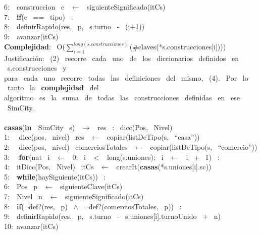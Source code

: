 \begin{Algoritmos}
    6:\indent \indent  \  \ construccion \ c \ $\leftarrow$ \ siguienteSignificado(itCs)\\
    7:\indent \indent  \  \ \textbf{if}(c \ == \ tipo) \ :\\
    8:\indent \indent \indent  \  \ definirRapido(res, \ p, \ s.turno \ - \ (i+1))\\
    9:\indent \indent  \  \ avanzar(itCs) \ \\
    \textbf{Complejidad}: \ O($\sum_{i=1}^{long(s.construcciones)}$($ \# $claves(*s.construcciones[i])))\\
    Justificaci\'on: \ (2) \ recorre \ cada \ uno \ de \ los \ diccionarios \ definidos \ en \ s.construcciones \ y\\
    para \ cada \ uno \ recorre \ todas \ las \ definiciones \ del \ mismo, \ (4). \ Por \ lo \ tanto \ la \ \textbf{complejidad} \ del\\
    algoritmo \ es \ la \ suma \ de \ todas \ las \ construcciones \ definidas \ en \ ese \ SimCity.\\
    \makebox[\linewidth]{\rule{\textwidth}{0.4pt}}
    \\
    \makebox[\linewidth]{\rule{\textwidth}{0.4pt}}
    \textbf{casas}(\textbf{in \ }SimCity \ s) \ $\rightarrow $ \ res \ : \ dicc(Pos, \ Nivel)\\
    1: \  \ dicc(pos, \ nivel) \ res \ $\leftarrow$ \ copiar(listDeTipo(s, \ ``casa''))\\
    2: \  \ dicc(pos, \ nivel) \ comerciosTotales \ $\leftarrow$ \ copiar(listDeTipo(s, \ ``comercio''))\\
    3: \  \ \textbf{for}(nat \ i \ $\leftarrow$ \ 0; \ i \ $<$ \ long(s.uniones); \ i \ $\leftarrow$ \ i \ + \ 1) \ : \ \\
    4:\indent  \  \ itDicc(Pos, \ Nivel) \ itCs \ $\leftarrow$ \ crearIt(\textbf{casas}(*s.uniones[i].sc))\\
    5:\indent  \  \ \textbf{while}(haySiguiente(itCs)) \ :\\
    6:\indent \indent  \  \ Pos \ p \ $\leftarrow$ \ siguienteClave(itCs)\\
    7:\indent \indent  \  \ Nivel \ n \ $\leftarrow$ \ siguienteSignificado(itCs)\\
    8:\indent \indent  \  \ \textbf{if}($\neg$def?(res, \ p) \ $\wedge$ \ $\neg$def?(comerciosTotales, \ p)) \ :\\
    9:\indent \indent \indent  \  \ definirRapido(res, \ p, \ s.turno \ - \ s.uniones[i].turnoUnido \ + \ n)\\
    10:\indent \indent  \ avanzar(itCs)\\

\end{Algoritmos}
